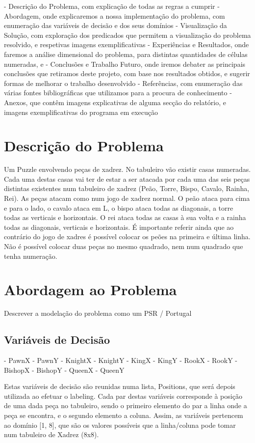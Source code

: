 \documentclass[runningheads]{llncs}
\begin{document}
 - Descrição do Problema, com explicação de todas as regras a cumprir
 - Abordagem, onde explicaremos a nossa implementação do problema, com enumeração das variáveis de decisão e dos seus domínios
 - Visualização da Solução, com exploração dos predicados que permitem a visualização do problema resolvido, e respetivas imagens exemplificativas
 - Experiências e Resultados, onde faremos a análise dimensional do problema, para distintas quantidades de células numeradas, e  
 - Conclusões e Trabalho Futuro, onde iremos debater as principais conclusões que retiramos deste projeto, com base nos resultados obtidos, e sugerir formas de melhorar o trabalho desenvolvido
 - Referências, com enumeração das várias fontes bibliográficas que utilizamos para a procura de conhecimento
 - Anexos, que contêm imagens explicativas de alguma secção do relatório, e imagens exemplificativas do programa em execução

\section{Descrição do Problema}
Um Puzzle envolvendo peças de xadrez. No tabuleiro vão existir casas numeradas. Cada uma destas casas vai ter de estar
a ser atacada por cada uma das seis peças distintas existentes num tabuleiro de xadrez (Peão, Torre, Bispo, Cavalo, Rainha, Rei). As peças atacam como num jogo de xadrez normal.
O peão ataca para cima e para o lado, o cavalo ataca em L, o bispo ataca todas as diagonais, a torre todas as verticais e horizontais. O rei ataca todas as casas à sua volta e a 
rainha todas as diagonais, verticais e horizontais. É importante referir ainda que ao contrário do jogo de xadres é possível colocar os peões 
na primeira e última linha. Não é possível colocar duas peças
 no mesmo quadrado, nem num quadrado que tenha numeração.

 
\section{Abordagem ao Problema}
Descrever a modelação do problema como um PSR / Portugal

\subsection{Variáveis de Decisão}
    - PawnX
    - PawnY
    - KnightX
    - KnightY
    - KingX
    - KingY
    - RookX
    - RookY
    - BishopX
    - BishopY
    - QueenX
    - QueenY

    Estas variáveis de decisão são reunidas numa lista, Positions, que será depois utilizada ao efetuar o labeling.
    Cada par destas variáveis corresponde à posição de uma dada peça no tabuleiro, sendo o primeiro elemento do par a linha onde a peça se encontra, e o segundo elemento a coluna.
    Assim, as variáveis pertencem ao domínio [1, 8], que são os valores possíveis que a linha/coluna pode tomar num tabuleiro de Xadrez (8x8).
    
\end{document}
